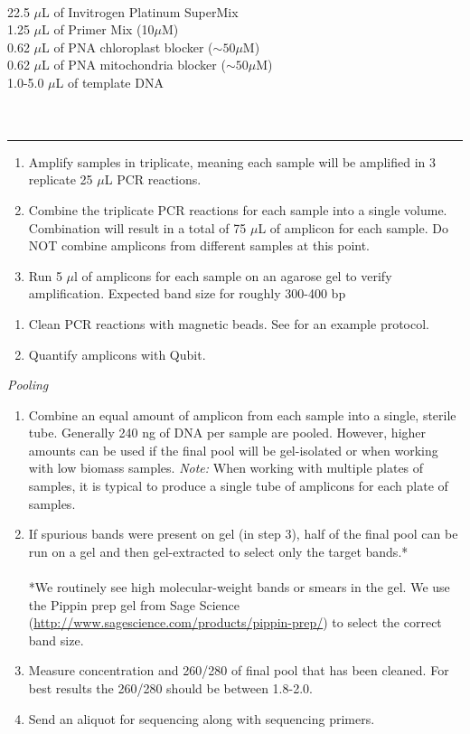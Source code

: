 \documentclass[11pt]{article}
\begin{document}
\noindent{\rule{\textwidth}{1pt}} %
 \\
\hfill
22.5 $\mu$L of Invitrogen Platinum SuperMix \\
\hfill
1.25 $\mu$L of Primer Mix (10$\mu$M)\\
\hfill
0.62 $\mu$L of PNA chloroplast blocker ($\sim50\mu$M)\\
\hfill
0.62 $\mu$L of PNA mitochondria blocker ($\sim50\mu$M)\\
\hfill
1.0-5.0 $\mu$L of template DNA
\\
\\
\\
\rule{\textwidth}{1pt} %
\medskip \break
{}
\begin{enumerate}
\item Amplify samples in triplicate, meaning each sample will be amplified in 3 replicate 25 $\mu$L PCR reactions.
\item Combine the triplicate PCR reactions for each sample into a single volume. Combination will result in a total of 75 $\mu$L of amplicon for each sample. Do NOT combine amplicons from different samples at this point.
\item Run 5 $\mu$l of amplicons for each sample on an agarose gel to verify amplification. Expected band size for roughly 300-400 bp
\end{enumerate}
\begin{enumerate}[resume]
\item{Clean PCR reactions with magnetic beads. See  for an example protocol.}
\item Quantify amplicons with Qubit.
\end{enumerate}
\emph{Pooling}
\begin{enumerate}[resume]
\item Combine an equal amount of amplicon from each sample into a single, sterile tube. Generally 240 ng of DNA per sample are pooled. However, higher amounts can be used if the final pool will be gel-isolated or when working with low biomass samples.
\emph{Note:} When working with multiple plates of samples, it is typical to produce a single tube of amplicons for each plate of samples.
\item If spurious bands were present on gel (in step 3), half of the final pool can be run on a gel and then gel-extracted to select only the target bands.*
\\
\\
*We routinely see high molecular-weight bands or smears in the gel. We use the Pippin prep gel from Sage Science (\href{http://www.sagescience.com/products/pippin-prep/}{http://www.sagescience.com/products/pippin-prep/}) to select the correct band size.
\item Measure concentration and 260/280 of final pool that has been cleaned. For best results the 260/280 should be between 1.8-2.0.
\item Send an aliquot for sequencing along with sequencing primers.
\end{enumerate}
\end{document}
